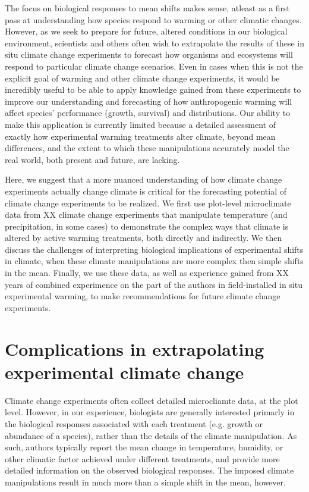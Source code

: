 \documentclass{article}
\begin{document}
\par The focus on biological responses to mean shifts makes sense, atleast as a first pass at understanding how species respond to warming or other climatic changes. However, as we seek to prepare for future, altered conditions in our biological environment, scientists and others often wish to extrapolate the results of these in situ climate change experiments to forecast how organisms and ecosystems will respond to particular climate change scenarios. Even in cases when this is not the explicit goal of warming and other climate change experiments, it would be incredibly useful to be able to apply knowledge gained from these experiments to improve our understanding and forecasting of how anthropogenic warming will affect species' performance (growth, survival) and distributions. Our ability to make this application is currently limited because a detailed assessment of exactly how experimental warming treatments alter climate, beyond mean differences, and the extent to which these manipulations accurately model the real world, both present and future, are lacking.
\par Here, we suggest that a more nuanced understanding of how climate change experiments actually change climate is critical for the forecasting potential of climate change experiments to be realized. We first use plot-level microclimate data from XX climate change experiments that manipulate temperature (and precipitation, in some cases) to demonstrate the complex ways that climate is altered by active warming treatments, both directly and indirectly. We then discuss the challenges of interpreting biological implications of experimental shifts in climate, when these climate manipulations are more complex then simple shifts in the mean. Finally, we use these data, as well as experience gained from XX years of combined experimence on the part of the authors in field-installed in situ experimental warming, to make recommendations for future climate change experiments.
 
\section {Complications in extrapolating experimental climate change}
Climate change experiments often collect detailed microcliamte data, at the plot level. However, in our experience, biologists are generally interested primarly in the biological responses associated with each treatment (e.g. growth or abundance of a species), rather than the details of the climate manipulation. As such, authors typically report the mean change in temperature, humidity, or other climatic factor achieved under different treatments, and provide more detailed information on the observed biological responses. The imposed climate manipulations result in much more than a simple shift in the mean, however.
\end{document}
